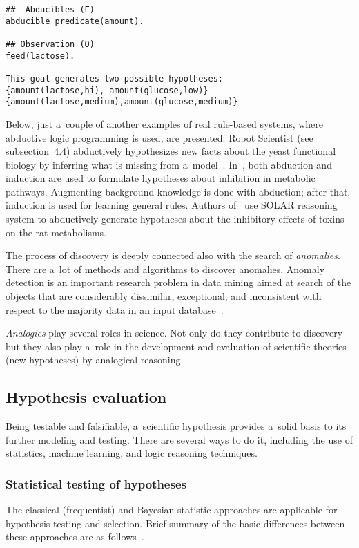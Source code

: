 \begin{multicols}{2}
{\begin{verbatim}
##  Abducibles (Г)
abducible_predicate(amount).

## Observation (O)
feed(lactose).

This goal generates two possible hypotheses:
{amount(lactose,hi), amount(glucose,low)}
{amount(lactose,medium),amount(glucose,medium)}
\end{verbatim}
}

Below, just a~couple of another examples of real rule-based systems, where abductive
logic programming is used, are presented.
Robot Scientist (see subsection~4.4) abductively hypothesizes new
facts about the yeast functional biology by inferring what is missing from a~model~\cite{23-kl}. In~\cite{24-kl}, both abduction and induction are used to
formulate hypotheses about inhibition in metabolic pathways. Augmenting
background knowledge is done with abduction; after that, induction is used for
learning general rules.  Authors of~\cite{25-kl} use SOLAR reasoning system to
abductively generate hypotheses about the inhibitory effects of toxins on the rat
metabolisms.

  The process of discovery is deeply connected also with the search of
\textit{anomalies}. There are a~lot of methods and algorithms to discover anomalies.
Anomaly detection is an important research problem in data mining
aimed at search of the
objects that are considerably dissimilar, exceptional, and inconsistent with respect to
the majority data in an input database~\cite{26-kl}.

  \textit{Analogies} play several roles in science. Not only do they contribute to
discovery but they also play a~role in the development and evaluation of scientific
theories (new hypotheses) by analogical reasoning.

\subsection{Hypothesis evaluation}

  \noindent
  Being testable and falsifiable, a~scientific hypothesis provides a~solid basis to its
further modeling and testing. There are several ways to do it, including the use of
statistics, machine learning, and logic reasoning techniques.

\subsubsection{Statistical testing of hypotheses }

  \noindent
  The classical (frequentist) and Bayesian statistic approaches are applicable for
hypothesis testing and selection. Brief summary of the basic differences between
these approaches are as follows~\cite{27-kl}.


\end{multicols}
